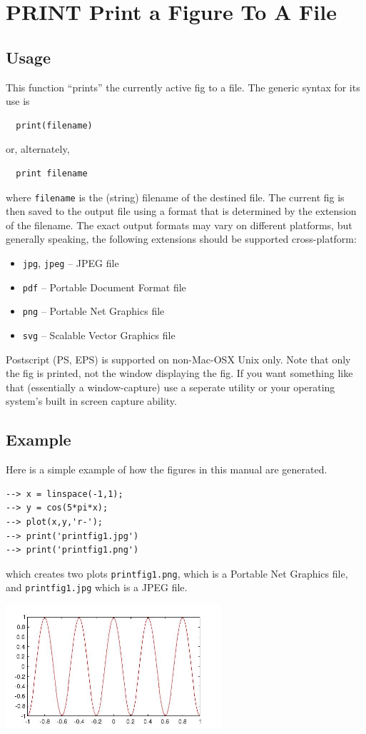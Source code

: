 \section{PRINT Print a Figure To A File}

\subsection{Usage}

This function ``prints'' the currently active fig to a file.  The 
generic syntax for its use is
\begin{verbatim}
  print(filename)
\end{verbatim}
or, alternately,
\begin{verbatim}
  print filename
\end{verbatim}
where \verb|filename| is the (string) filename of the destined file.  The current
fig is then saved to the output file using a format that is determined
by the extension of the filename.  The exact output formats may vary on
different platforms, but generally speaking, the following extensions
should be supported cross-platform:
\begin{itemize}
\item  \verb|jpg|, \verb|jpeg|  --  JPEG file 

\item  \verb|pdf| -- Portable Document Format file

\item  \verb|png| -- Portable Net Graphics file

\item  \verb|svg| -- Scalable Vector Graphics file

\end{itemize}
Postscript (PS, EPS) is supported on non-Mac-OSX Unix only.
Note that only the fig is printed, not the window displaying
the fig.  If you want something like that (essentially a window-capture)
use a seperate utility or your operating system's built in screen
capture ability.
\subsection{Example}

Here is a simple example of how the figures in this manual are generated.
\begin{verbatim}
--> x = linspace(-1,1);
--> y = cos(5*pi*x);
--> plot(x,y,'r-');
--> print('printfig1.jpg')
--> print('printfig1.png')
\end{verbatim}
which creates two plots \verb|printfig1.png|, which is a Portable
Net Graphics file, and \verb|printfig1.jpg| which is a JPEG file.


\centerline{\includegraphics[width=8cm]{printfig1}}

